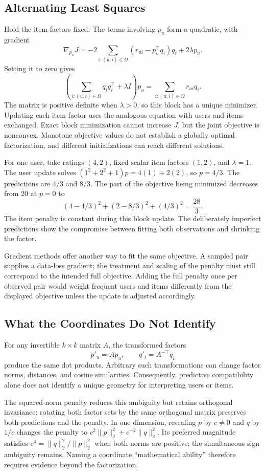 \subsection{Alternating Least Squares}

Hold the item factors fixed. The terms involving $p_u$ form a quadratic, with gradient
\[
\nabla_{p_u}J=-2\sum_{i:(u,i)\in\Omega}(r_{ui}-p_u^\top q_i)q_i+2\lambda p_u.
\]
Setting it to zero gives
\[
\left(\sum_{i:(u,i)\in\Omega}q_iq_i^\top+\lambda I\right)p_u
=\sum_{i:(u,i)\in\Omega}r_{ui}q_i.
\]
The matrix is positive definite when $\lambda>0$, so this block has a unique minimizer. Updating each item factor uses the analogous equation with users and items exchanged. Exact block minimization cannot increase $J$, but the joint objective is nonconvex. Monotone objective values do not establish a globally optimal factorization, and different initializations can reach different solutions.

For one user, take ratings $(4,2)$, fixed scalar item factors $(1,2)$, and $\lambda=1$. The user update solves $(1^2+2^2+1)p=4(1)+2(2)$, so $p=4/3$. The predictions are $4/3$ and $8/3$. The part of the objective being minimized decreases from $20$ at $p=0$ to
\[
(4-4/3)^2+(2-8/3)^2+(4/3)^2=\frac{28}{3}.
\]
The item penalty is constant during this block update. The deliberately imperfect predictions show the compromise between fitting both observations and shrinking the factor.

Gradient methods offer another way to fit the same objective. A sampled pair supplies a data-loss gradient; the treatment and scaling of the penalty must still correspond to the intended full objective. Adding the full penalty once per observed pair would weight frequent users and items differently from the displayed objective unless the update is adjusted accordingly.

\subsection{What the Coordinates Do Not Identify}

For any invertible $k\times k$ matrix $A$, the transformed factors
\[
p'_u=A p_u,\qquad q'_i=A^{-\top}q_i
\]
produce the same dot products. Arbitrary such transformations can change factor norms, distances, and cosine similarities. Consequently, predictive compatibility alone does not identify a unique geometry for interpreting users or items.

The squared-norm penalty reduces this ambiguity but retains orthogonal invariance: rotating both factor sets by the same orthogonal matrix preserves both predictions and the penalty. In one dimension, rescaling $p$ by $c\ne0$ and $q$ by $1/c$ changes the penalty to $c^2\|p\|_2^2+c^{-2}\|q\|_2^2$. Its preferred magnitude satisfies $c^4=\|q\|_2^2/\|p\|_2^2$ when both norms are positive; the simultaneous sign ambiguity remains. Naming a coordinate ``mathematical ability'' therefore requires evidence beyond the factorization.

